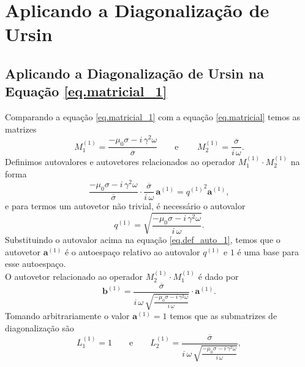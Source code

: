 \chapter{Aplicando a Diagonaliza\c{c}\~ao de Ursin}\label{sec.diagonalizacao_ursin}

   

\section{Aplicando a Diagonaliza\c{c}\~ao de Ursin na Equa\c{c}\~ao \ref{eq.matricial_1}}\label{sec.diagonalizacao_1}

Comparando a equa\c{c}\~ao \ref{eq.matricial_1} com a equa\c{c}\~ao \ref{eq.matricial} temos as matrizes
\begin{equation*}
M^{(1)}_1=\frac{-\mu_0\sigma-i\,\gamma^2\omega}{\overline{\sigma}}\qquad\text{e}\qquad\,M^{(1)}_2=\frac{\overline{\sigma}}{i\,\omega}.
\end{equation*}
Definimos autovalores e autovetores relacionados ao operador $M^{(1)}_1\cdot M^{(1)}_2$ na forma 
\begin{equation}\label{eq.def_auto_1}
\frac{-\mu_0\sigma-i\,\gamma^2\omega}{\overline{\sigma}}\cdot\frac{\overline{\sigma}}{i\,\omega}\,\mathbf{a}^{(1)}={q^{(1)}}^2\mathbf{a}^{(1)},
\end{equation}
e para termos um autovetor n\~ao trivial, \'e necess\'ario o autovalor
\begin{equation*}
q^{(1)}=\sqrt{\frac{-\mu_0\sigma-i\,\gamma^2\omega}{i\,\omega}}.
\end{equation*}
Substituindo o autovalor acima na equa\c{c}\~ao \ref{eq.def_auto_1}, temos que o autovetor $\mathbf{a}^{(1)}$ \'e o autoespa\c{c}o relativo ao autovalor $q^{(1)}$ e ${1}$ \'e uma base para esse autoespa\c{c}o.\\
O autovetor relacionado ao operador $M^{(1)}_2\cdot M^{(1)}_1$ \'e dado por
\begin{equation*}
\mathbf{b}^{(1)}=\frac{\overline{\sigma}}{i\,\omega\,\sqrt{\frac{-\mu_0\sigma-i\,\gamma^2\omega}{i\,\omega}}}\cdot\mathbf{a}^{(1)}.
\end{equation*}
Tomando arbitrariamente o valor $\mathbf{a}^{(1)}=1$ temos que as submatrizes de diagonaliza\c{c}\~ao s\~ao
\begin{equation*}
L^{(1)}_1=1\qquad\text{e}\qquad L^{(1)}_2=\frac{\overline{\sigma}}{i\,\omega\,\sqrt{\frac{-\mu_0\sigma-i\,\gamma^2\omega}{i\,\omega}}},
\end{equation*}
